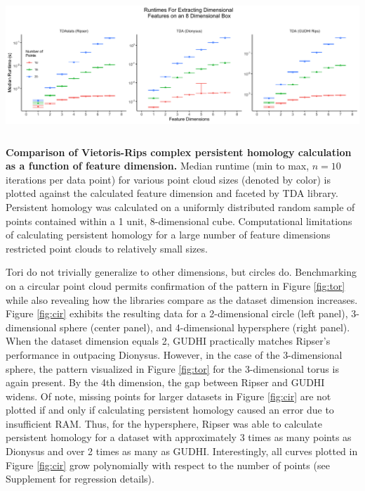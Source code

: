 \begin{widefigure}
  \centering
  \includegraphics[height=2in]{fig5.png}
  \caption{
    \textbf{Comparison of Vietoris-Rips complex persistent homology calculation as a function of feature dimension.}
    Median runtime (min to max, $n=10$ iterations per data point) for various point cloud sizes (denoted by color) is plotted against the calculated feature dimension and faceted by TDA library.
    Persistent homology was calculated on a uniformly distributed random sample of points contained within a 1 unit, 8-dimensional cube.
    Computational limitations of calculating persistent homology for a large number of feature dimensions restricted point clouds to relatively small sizes.}
\label{fig:box}
\end{widefigure}

Tori do not trivially generalize to other dimensions, but circles do.
Benchmarking on a circular point cloud permits confirmation of the
pattern in Figure \ref{fig:tor} while also revealing how the libraries
compare as the dataset dimension increases. Figure \ref{fig:cir} exhibits
the resulting data for a 2-dimensional circle (left panel),
3-dimensional sphere (center panel), and 4-dimensional hypersphere
(right panel). When the dataset dimension equals 2, GUDHI practically
matches Ripser's performance in outpacing Dionysus. However, in the case
of the 3-dimensional sphere, the pattern visualized in Figure
\ref{fig:tor} for the 3-dimensional torus is again present. By the 4th
dimension, the gap between Ripser and GUDHI widens. Of note, missing
points for larger datasets in Figure \ref{fig:cir} are not plotted if
and only if calculating persistent homology caused an error due to
insufficient RAM. Thus, for the hypersphere, Ripser was able to
calculate persistent homology for a dataset with approximately 3 times
as many points as Dionysus and over 2 times as many as GUDHI.
Interestingly, all curves plotted in Figure \ref{fig:cir} grow
polynomially with respect to the number of points (see Supplement for
regression details).


